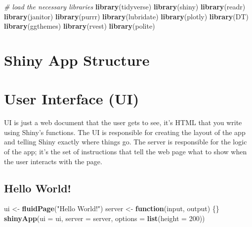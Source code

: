 \documentclass[
]{book}
\newenvironment{Shaded}{\begin{snugshade}}{\end{snugshade}}
\newcommand{\AttributeTok}[1]{\textcolor[rgb]{0.13,0.29,0.53}{#1}}
\newcommand{\CommentTok}[1]{\textcolor[rgb]{0.56,0.35,0.01}{\textit{#1}}}
\newcommand{\ControlFlowTok}[1]{\textcolor[rgb]{0.13,0.29,0.53}{\textbf{#1}}}
\newcommand{\DecValTok}[1]{\textcolor[rgb]{0.00,0.00,0.81}{#1}}
\newcommand{\FunctionTok}[1]{\textcolor[rgb]{0.13,0.29,0.53}{\textbf{#1}}}
\newcommand{\NormalTok}[1]{#1}
\newcommand{\OtherTok}[1]{\textcolor[rgb]{0.56,0.35,0.01}{#1}}
\newcommand{\StringTok}[1]{\textcolor[rgb]{0.31,0.60,0.02}{#1}}
\begin{document}
\begin{Shaded}
\begin{Highlighting}[]
\CommentTok{\# load the necessary libraries}
\FunctionTok{library}\NormalTok{(tidyverse)}
\FunctionTok{library}\NormalTok{(shiny)}
\FunctionTok{library}\NormalTok{(readr)}
\FunctionTok{library}\NormalTok{(janitor)}
\FunctionTok{library}\NormalTok{(purrr)}
\FunctionTok{library}\NormalTok{(lubridate)}
\FunctionTok{library}\NormalTok{(plotly)}
\FunctionTok{library}\NormalTok{(DT)}
\FunctionTok{library}\NormalTok{(ggthemes)}
\FunctionTok{library}\NormalTok{(rvest)}
\FunctionTok{library}\NormalTok{(polite)}
\end{Highlighting}
\end{Shaded}

\hypertarget{shiny-app-structure}{%
\section{Shiny App Structure}\label{shiny-app-structure}}

\hypertarget{user-interface-ui}{%
\section{User Interface (UI)}\label{user-interface-ui}}

UI is just a web document that the user gets to see, it's HTML that you write using Shiny's functions. The UI is responsible for creating the layout of the app and telling Shiny exactly where things go. The server is responsible for the logic of the app; it's the set of instructions that tell the web page what to show when the user interacts with the page.

\hypertarget{hello-world}{%
\subsection{Hello World!}\label{hello-world}}

\begin{Shaded}
\begin{Highlighting}[]
\NormalTok{ui }\OtherTok{\textless{}{-}} \FunctionTok{fluidPage}\NormalTok{(}\StringTok{"Hello World!"}\NormalTok{)}
\NormalTok{server }\OtherTok{\textless{}{-}} \ControlFlowTok{function}\NormalTok{(input, output) \{\}}
\FunctionTok{shinyApp}\NormalTok{(}\AttributeTok{ui =}\NormalTok{ ui, }\AttributeTok{server =}\NormalTok{ server, }\AttributeTok{options =} \FunctionTok{list}\NormalTok{(}\AttributeTok{height =} \DecValTok{200}\NormalTok{))}
\end{Highlighting}
\end{Shaded}
\end{document}
